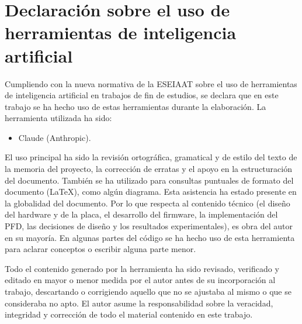 
\chapter{Declaración sobre el uso de herramientas de inteligencia artificial}
\label{ch:decl_ia}

Cumpliendo con la nueva normativa de la ESEIAAT sobre el uso de herramientas de inteligencia artificial en trabajos de fin de estudios, se declara que en este trabajo se ha hecho uso de estas herramientas durante la elaboración. La herramienta utilizada ha sido:

\begin{itemize}
    \item Claude (Anthropic).
\end{itemize}

El uso principal ha sido la revisión ortográfica, gramatical y de estilo del texto de la memoria del proyecto, la corrección de erratas y el apoyo en la estructuración del documento. También se ha utilizado para consultas puntuales de formato del documento (\LaTeX), como algún diagrama. Esta asistencia ha estado presente en la globalidad del documento. Por lo que respecta al contenido técnico (el diseño del hardware y de la placa, el desarrollo del firmware, la implementación del PFD, las decisiones de diseño y los resultados experimentales), es obra del autor en su mayoría. En algunas partes del código se ha hecho uso de esta herramienta para aclarar conceptos o escribir alguna parte menor.

Todo el contenido generado por la herramienta ha sido revisado, verificado y editado en mayor o menor medida por el autor antes de su incorporación al trabajo, descartando o corrigiendo aquello que no se ajustaba al mismo o que se consideraba no apto. El autor asume la responsabilidad sobre la veracidad, integridad y corrección de todo el material contenido en este trabajo.
